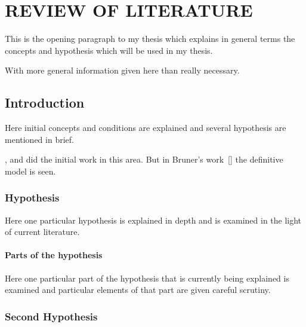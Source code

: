 \chapter{REVIEW OF LITERATURE}

This is the opening paragraph to my thesis which
explains in general terms the concepts and hypothesis
which will be used in my thesis.

With more general information given here than really
necessary.

\section{Introduction}

Here initial concepts and conditions are explained and
several hypothesis are mentioned in brief.

\cite{allen}, \cite{bruner} and \cite{cox}
did the initial work in this area. But in Bruner's work~[\cite{bruner}]
the definitive model is seen.

\subsection{Hypothesis}

Here one particular hypothesis is explained in depth
and is examined in the light of current literature.

\subsubsection{Parts of the hypothesis}

Here one particular part of the hypothesis that is 
currently being explained is examined and particular
elements of that part are given careful scrutiny.


\subsection{Second Hypothesis}

